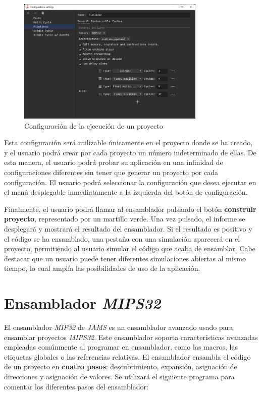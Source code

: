 \begin{figure}[h]
    \centering
    \includegraphics[width=0.8\textwidth]{images/mips/mips-configuration}
    \caption{Configuración de la ejecución de un proyecto}
    \label{fig:jams-configuration}
\end{figure}

Esta configuración será utilizable únicamente en el proyecto
donde se ha creado, y el usuario podrá crear por cada proyecto
un número indeterminado de ellas.
De esta manera, el usuario podrá probar su aplicación en una infinidad
de configuraciones diferentes sin tener que generar un proyecto por cada
configuración.
El usuario podrá seleccionar la configuración que desea ejecutar en
el menú desplegable inmediatamente a la izquierda del botón de configuración.

Finalmente, el usuario podrá llamar al ensamblador pulsando el botón
\textbf{construir proyecto}, representado por un martillo verde.
Una vez pulsado, el informe se desplegará y mostrará el resultado del ensamblador.
Si el resultado es positivo y el código se ha ensamblado, una pestaña con
una simulación aparecerá en el proyecto, permitiendo al usuario simular
el código que acaba de ensamblar.
Cabe destacar que un usuario puede tener diferentes simulaciones abiertas
al mismo tiempo, lo cual amplía las posibilidades de uso de la aplicación.


\section{Ensamblador \textit{MIPS32}}\label{sec:ensamblador-mips32}

El ensamblador \textit{MIP32} de \textit{JAMS} es un ensamblador avanzado
usado para ensamblar proyectos \textit{MIPS32}.
Este ensamblador soporta características avanzadas empleadas
comúnmente al programar en ensamblador, como las macros,
las etiquetas globales o las referencias relativas.
El ensamblador ensambla el código de un proyecto en \textbf{cuatro pasos}:
descubrimiento, expansión, asignación de direcciones y asignación de valores.
Se utilizará el siguiente programa para comentar los diferentes pasos del ensamblador:

